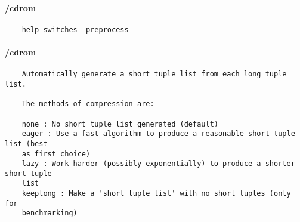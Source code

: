 \paragraph{/cdrom}
{\footnotesize
\begin{verbatim}
    help switches -preprocess
\end{verbatim}
}
\paragraph{/cdrom}
{\footnotesize
\begin{verbatim}
    Automatically generate a short tuple list from each long tuple list.

    The methods of compression are:

    none : No short tuple list generated (default)
    eager : Use a fast algorithm to produce a reasonable short tuple list (best
    as first choice)
    lazy : Work harder (possibly exponentially) to produce a shorter short tuple
    list
    keeplong : Make a 'short tuple list' with no short tuples (only for
    benchmarking)
\end{verbatim}
}
